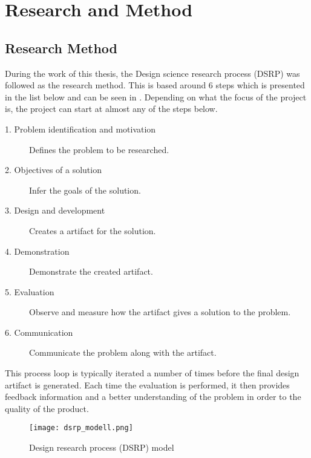 
\chapter{Research and Method} %
\label{cha:research_questions_and_method}

\section{Research Method} %
\label{sec:research_method}

During the work of this thesis, the Design science research process (DSRP) was
followed as the research method. 
This is based around 6 steps which is presented in the list
below and can be seen in . Depending on what the focus of the project is, the project can start at
almost any of the steps below.\cite{peffers2006design}

\begin{description}
	\item [1. Problem identification and motivation] Defines the problem to be
	researched. 
	\item [2. Objectives of a solution] Infer the goals of the solution.
	\item [3. Design and development] Creates a artifact for the solution.
	\item [4. Demonstration] Demonstrate the created artifact.
	\item [5. Evaluation] Observe and measure how the artifact gives a solution 
	to the problem.
	\item [6. Communication] Communicate the problem along with the artifact.
\end{description}


This process loop is typically iterated a number of times before the final
design artifact is generated. Each time the evaluation is
performed, it then provides feedback information and a better understanding of
the problem in order to the quality of the product.\cite{von2004design}

\begin{figure}[!htbp]
	\texttt{[image: dsrp\_modell.png]}
	\caption[Design science research process (DSRP) model]{Design research process (DSRP)
	model\cite{peffers2006design}}
	\label{fig:DSRP}
\end{figure}



